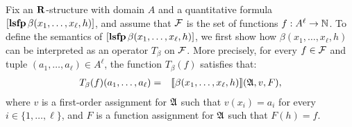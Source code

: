 Fix an $\mathbf{R}$-structure with domain $A$ and a quantitative formula $[{\bf lsfp} \, \beta(x_1,\ldots,x_\ell,h)]$, and assume that $\F$ is the set of functions $f :A^\ell \to \mathbb{N}$. To define the semantics of $[{\bf lsfp} \, \beta(x_1,\ldots,x_\ell,h)]$, we first show how $\beta(x_1,\ldots,x_\ell,h)$ can be interpreted as an operator $T_{\beta}$ on $\F$. More precisely, for every $f \in \F$ and tuple $(a_1, \ldots, a_\ell) \in A^\ell$, the function $T_{\beta}(f)$ satisfies that:
\begin{eqnarray*}
T_{\beta}(f)(a_1, \ldots, a_\ell) & = & {\llbracket{}{\beta(x_1, \ldots, x_\ell, h)}\rrbracket}(\mathfrak{A},v,F),
\end{eqnarray*}
where $v$ is a first-order assignment  for $\mathfrak{A}$ such that $v(x_i) = a_i$ for every $i \in \{1, \ldots, \ell\}$, and $F$ is a function assignment for $\mathfrak{A}$ such that $F(h) = f$. 


